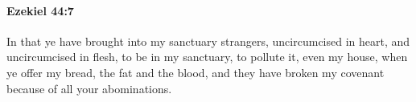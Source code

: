 
		\paragraph{Ezekiel 44:7} %
			\label{EZEKIEL-44-7}

			In that ye have brought into my sanctuary strangers, uncircumcised in heart, and uncircumcised in flesh, to be in my sanctuary, to pollute it, even my house, when ye offer my bread, the fat and the blood, and they have broken my covenant because of all your abominations.



